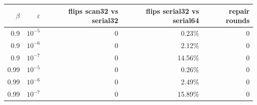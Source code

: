 \begin{tabular}{rrrrr}
\toprule
$\beta$ & $\varepsilon$ & flips scan32 vs serial32 & flips serial32 vs serial64 & repair rounds\\
\midrule
0.9 & $10^{-5}$ & 0 & 0.23\% & 0\\
0.9 & $10^{-6}$ & 0 & 2.12\% & 0\\
0.9 & $10^{-7}$ & 0 & 14.56\% & 0\\
0.99 & $10^{-5}$ & 0 & 0.26\% & 0\\
0.99 & $10^{-6}$ & 0 & 2.49\% & 0\\
0.99 & $10^{-7}$ & 0 & 15.89\% & 0\\
\bottomrule
\end{tabular}
